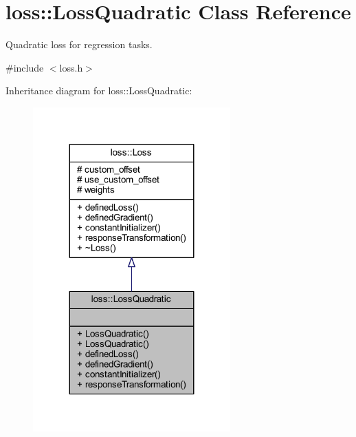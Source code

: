 \hypertarget{classloss_1_1_loss_quadratic}{}\section{loss\+:\+:Loss\+Quadratic Class Reference}
\label{classloss_1_1_loss_quadratic}


Quadratic loss for regression tasks.  




{\ttfamily \#include $<$loss.\+h$>$}



Inheritance diagram for loss\+:\+:Loss\+Quadratic\+:
\nopagebreak
\begin{figure}[H]
\begin{center}
\leavevmode
\includegraphics[width=215pt]{classloss_1_1_loss_quadratic__inherit__graph}
\end{center}
\end{figure}


